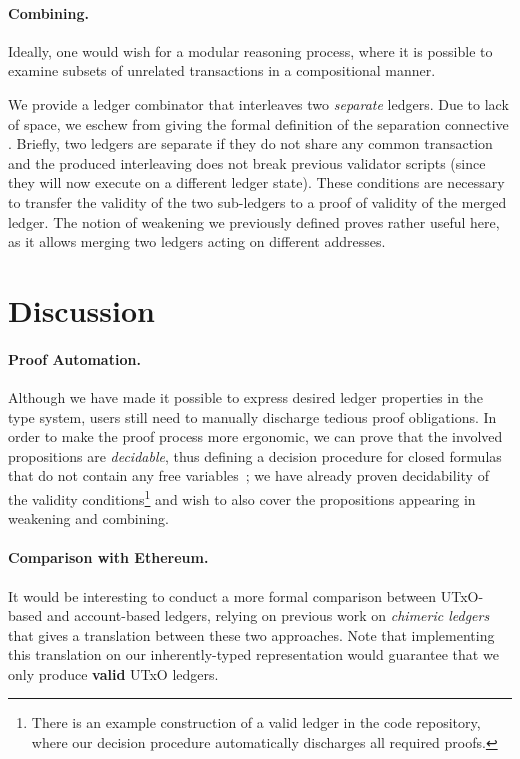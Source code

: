 \documentclass[sigplan,review,screen]{acmart}\settopmatter{printfolios=true,printccs=false,printacmref=false}
\begin{document}
\paragraph{Combining.}
Ideally, one would wish for a modular reasoning process, where it is possible to examine subsets of 
unrelated transactions in a compositional manner.

We provide a ledger combinator that interleaves two \textit{separate} ledgers.
Due to lack of space, we eschew from giving the formal definition of the separation connective \inlineAst{}.
Briefly, two ledgers are separate if they do not share any common transaction and the produced interleaving 
does not break previous validator scripts (since they will now execute on a different ledger state).
These conditions are necessary to transfer the validity of the two sub-ledgers to a proof of validity of the merged ledger.
\combining{}
The notion of weakening we previously defined proves rather useful here,
as it allows merging two ledgers acting on different addresses.

\section{Discussion}
\label{sec:discussion}
\paragraph{Proof Automation.}
Although we have made it possible to express desired ledger properties in the type system,
users still need to manually discharge tedious proof obligations.
In order to make the proof process more ergonomic, we can prove that the involved propositions are \textit{decidable},
thus defining a decision procedure for closed formulas that do not contain any free variables~\cite{proofbyreflection};
we have already proven decidability of the validity conditions\footnote{
There is an example construction of a valid ledger in the code repository,
where our decision procedure automatically discharges all required proofs.
}
and wish to also cover the propositions appearing in weakening and combining.

\paragraph{Comparison with Ethereum.}
It would be interesting to conduct a more formal comparison between UTxO-based and account-based ledgers,
relying on previous work on \textit{chimeric ledgers}~\cite{chimeric} that gives a translation between these two approaches.
Note that implementing this translation on our inherently-typed representation would
guarantee that we only produce \textbf{valid} UTxO ledgers.
\end{document}
